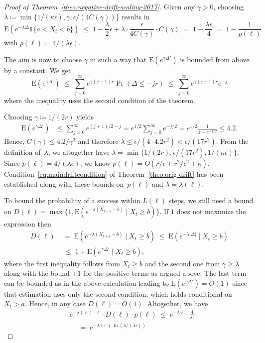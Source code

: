 \documentclass[11pt, a4paper]{article}
\DeclareMathOperator{\Prob}{Pr}
\newcommand*{\E}{\mathrm{E}}
\newcommand{\indic}[1]{\mathds{1}\{#1\}}
\begin{document}
\begin{proof}[Proof of {Theorem~\ref{theo:negative-drift-scaling-2017}}]
  Given any $\gamma>0$, choosing $\lambda\coloneqq \min\{1/(\kappa\epsilon), \gamma,
  \epsilon/(4C(\gamma))\}$ results in
  \[
  \E(e^{-\lambda \Delta}\indic{a<X_t<b})  \;\le\; 1- \frac{\lambda}{2}\epsilon + \lambda\cdot \frac{\epsilon}{4C(\gamma)}\cdot C(\gamma) 
  \;=\; 1-\frac{\lambda \epsilon}{4} \;=\;  1-\frac{1}{p(\ell)}
  \]
  with $p(\ell)\coloneqq 4/(\lambda \epsilon)$.
		
	
	The aim is now to choose $\gamma$ in such a way that $\E(e^{\gamma \Delta'})$ is bounded from 
	above by a constant.
	We get
	\[
	\E(e^{\gamma \Delta'}) \;\le\; \sum_{j=0}^\infty e^{\gamma (j+1)r} \Prob(\Delta \le -jr) 
	 \;\le\; 
	\sum_{j=0}^\infty e^{\gamma (j+1)r} e^{- j }  
	\]
	where the inequality uses the second condition of the theorem.
	
 	
  Choosing $\gamma\coloneqq 1/(2r)$ yields
	 \begin{align*}
	\E(e^{\gamma \Delta'})
    & \le \sum_{j=0}^\infty e^{(j+1)/2 - j }
     = e^{1/2} \sum_{j=0}^\infty e^{-j/2}
		 = e^{1/2} \frac{1}{1-e^{-1/2}}
		\le 4.2.
  \end{align*}
	Hence, $C(\gamma)\le 4.2/\gamma^2$ and
  therefore 	
	$\lambda\le \epsilon/(4\cdot 4.2r^2)< \epsilon/(17r^2)$. 
  From the definition of~$\lambda$, we altogether have 
	 $\lambda = \min\{1/(2r),\epsilon/(17r^2),1/(\kappa\epsilon)\}$. 
	Since $p(\ell)=4/(\lambda \epsilon)$, we know $p(\ell)=O(r / \epsilon + r^2/\epsilon^2 + \kappa )$.
  Condition~\eqref{eq:maindriftcondition} of
  Theorem~\ref{theo:orig-drift} has been established along with these
  bounds on~$p(\ell)$ and $\lambda=\lambda(\ell)$.
	
	
	
  
  To bound the probability of a success within $L(\ell)$ steps, we
  still need a bound on $D(\ell)=\max\{1,\E(e^{-\lambda(X_{t+1}-b)}\mid
  X_t\ge b)\}$. If $1$ does not maximize the expression then 
	 \begin{align*}
   D(\ell) & \;=\; \E(e^{-\lambda(X_{t+1}-b)}\mid X_t\ge b)
  \;\le\; \E(e^{-\lambda\lvert \Delta\rvert}\mid X_t\ge b) \\
  &\, %
  \;\le \; 1+ \E(e^{\gamma \Delta'}\mid X_t\ge b),
  \end{align*}
  where the first inequality follows from $X_t\ge b$ 
  and 
  the second one from $\gamma\ge \lambda$ along with 
	the bound $+1$ for the positive terms as argued above.  The last term can be bounded 
  as in the above calculation leading to $\E(e^{\gamma \Delta'})=O(1)$ since 
  that estimation uses only the second condition, which holds 
  conditional on $X_t > a$. Hence, in any case $D(\ell) =
  O(1)$.  
  Altogether,  we
  have 
  \begin{align*}
  & e^{-\lambda(\ell)\cdot \ell}\cdot D(\ell) \cdot p(\ell) \;\le\; 
  e^{-\lambda\ell} \cdot \frac{4}{\lambda\epsilon} \\
  & \quad \;=\; e^{-\lambda\ell\epsilon + \ln(4/(\lambda\epsilon))}
  \end{align*}
	

\end{proof}
\end{document}
